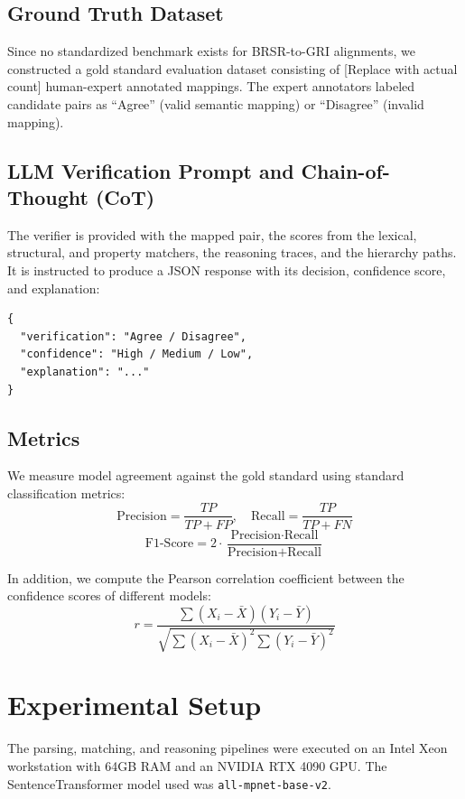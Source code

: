 \documentclass[journal,compsoc]{IEEEtran}
\begin{document}
\subsection{Ground Truth Dataset}
Since no standardized benchmark exists for BRSR-to-GRI alignments, we constructed a gold standard evaluation dataset consisting of [Replace with actual count] human-expert annotated mappings. The expert annotators labeled candidate pairs as ``Agree'' (valid semantic mapping) or ``Disagree'' (invalid mapping).

\subsection{LLM Verification Prompt and Chain-of-Thought (CoT)}
The verifier is provided with the mapped pair, the scores from the lexical, structural, and property matchers, the reasoning traces, and the hierarchy paths. It is instructed to produce a JSON response with its decision, confidence score, and explanation:
\begin{verbatim}
{
  "verification": "Agree / Disagree",
  "confidence": "High / Medium / Low",
  "explanation": "..."
}
\end{verbatim}

\subsection{Metrics}
We measure model agreement against the gold standard using standard classification metrics:
\begin{equation}
\text{Precision} = \frac{TP}{TP + FP}, \quad \text{Recall} = \frac{TP}{TP + FN}
\end{equation}
\begin{equation}
\text{F1-Score} = 2 \cdot \frac{\text{Precision} \cdot \text{Recall}}{\text{Precision} + \text{Recall}}
\end{equation}

In addition, we compute the Pearson correlation coefficient between the confidence scores of different models:
\begin{equation}
r = \frac{\sum (X_i - \bar{X})(Y_i - \bar{Y})}{\sqrt{\sum (X_i - \bar{X})^2 \sum (Y_i - \bar{Y})^2}}
\end{equation}

\section{Experimental Setup}
The parsing, matching, and reasoning pipelines were executed on an Intel Xeon workstation with 64GB RAM and an NVIDIA RTX 4090 GPU. The SentenceTransformer model used was \texttt{all-mpnet-base-v2}.
\end{document}
